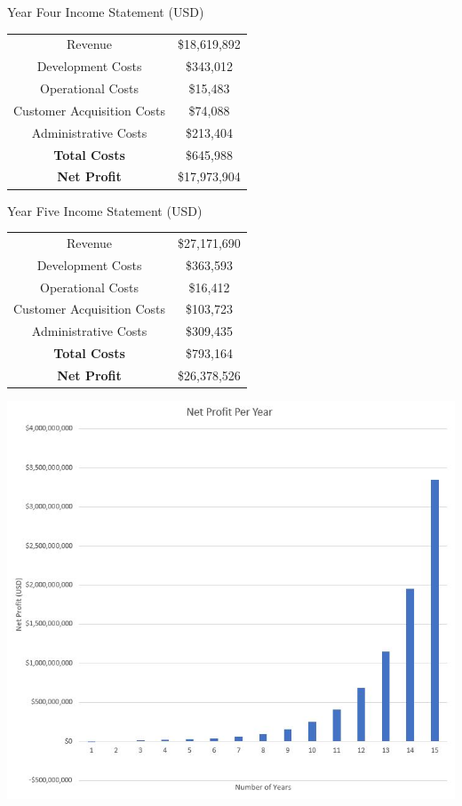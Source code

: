 \documentclass[12pt]{article}
\begin{document}
\vspace{1.5cm}
\begin{center}
	Year Four Income Statement (USD) \\[1.5ex]
	
	\begin{tabular}{c | c}
	Revenue & \$18,619,892 \\
	Development Costs & \$343,012\\
	Operational Costs & \$15,483 \\
	Customer Acquisition Costs & \$74,088 \\
	Administrative Costs & \$213,404 \\
	\textbf{Total Costs} & \$645,988 \\
	\textbf{Net Profit} & \$17,973,904
	\end{tabular}
\end{center}
\vspace{1.5cm}
\pagebreak
\begin{center}
	Year Five Income Statement (USD) \\%
	
	\begin{tabular}{c | c}
	Revenue & \$27,171,690 \\
	Development Costs & \$363,593 \\
	Operational Costs & \$16,412 \\
	Customer Acquisition Costs & \$103,723\\
	Administrative Costs & \$309,435 \\
	\textbf{Total Costs} & \$793,164 \\
	\textbf{Net Profit} & \$26,378,526
	\end{tabular}
\end{center}
\begin{center}
	\includegraphics[scale=0.75]{NetProfit}\\
\end{center}
\pagebreak
\end{document}
